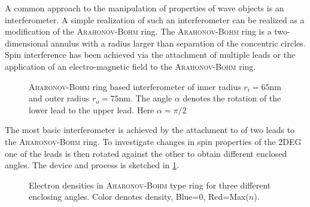A common approach to the manipulation of properties of wave objects is an interferometer. A simple realization of such an interferometer can be realized as a modification of the \textsc{Arahonov-Bohm} ring. The \textsc{Arahonov-Bohm} ring is a two-dimensional annulus with a radius larger than separation of the concentric circles. Spin interference has been achieved via the attachment of multiple leads \cite{PhysRevB.75.035304} or the application of an electro-magnetic field \cite{PhysRevB.69.155335} to the \textsc{Arahonov-Bohm} ring.\par
\begin{figure}[!h]
\centering
{}
\caption{\textsc{Aharonov-Bohm} ring based interferometer of inner radius $r_i=65$nm and outer radius $r_o=75$nm. The angle $\alpha$ denotes the rotation of the lower lead to the upper lead. Here $\alpha=\pi/2$}\label{fig:aharonovbohmring}
\end{figure}
The most basic interferometer is achieved by the attachment to of two leads to the \textsc{Aharonov-Bohm} ring. To investigate changes in spin properties of the 2DEG one of the leads is then rotated against the other to obtain different enclosed angles. The device and process is sketched in \cref{fig:aharonovbohmring}.
\begin{figure}[h!]
\caption{Electron densities in \textsc{Aharonov-Bohm} type ring for three different enclosing angles. Color denotes density, Blue=0, Red=Max($n$).} 
\end{figure}
